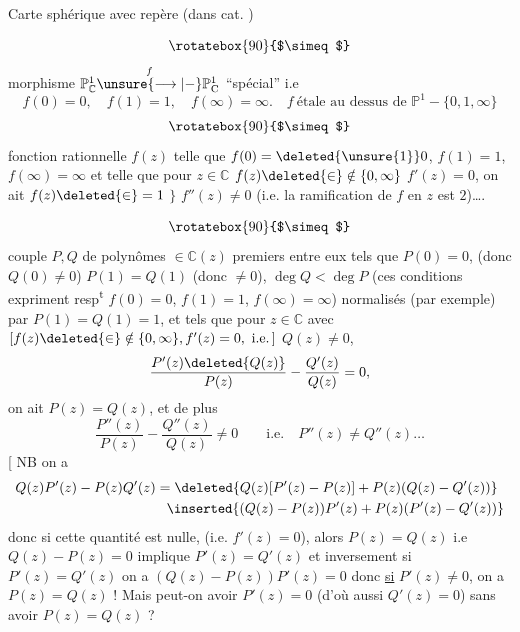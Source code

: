 Carte sphérique  avec repère (dans cat. )

\[
\rotatebox{90}{$\simeq$}
\]
morphisme $\mathbb P^{1}_{\mathbb C}\overset{f}{\unsure{\longrightarrow|-}}\mathbb P^{1}_{\mathrm C}$ ``spécial'' i.e
\[
 f(0)=0,\quad f(1)=1,\quad f(\infty)=\infty.\quad f\ \text{étale au dessus de }\mathbb P^{1}-\{0,1,\infty\}
\]
\[
\rotatebox{90}{$\simeq$}
\]
fonction rationnelle $f(z)$ telle que $f(0)=\deleted{\unsure{1}}0$, $f(1)=1$, $f(\infty)=\infty$ et telle que pour $z\in\mathbb C$  $f(z)\deleted{\in}\notin\{0,\infty\}$ $f'(z)=0$, on ait $f(z)\deleted{\in}=1$ $\}$  $f''(z)\ne0$ (i.e. la ramification de $f$ en $z$ est $2$)\ldots.

\[
\rotatebox{90}{$\simeq$}
\]
couple $P,Q$ \inserted{$[f=P/Q\quad !\,]$} de polynômes $\in\mathbb C(z)$ premiers entre eux  tels que $P(0)=0$, (donc $Q(0)\ne0$) $P(1)=Q(1)$ (donc $\ne0$), $\deg Q<\deg P$ (ces conditions expriment resp\textsuperscript{t} $f(0)=0$, $f(1)=1$, $f(\infty)=\infty$)
normalisés (par exemple) par $P(1)=Q(1)=1$, et tels que pour $z\in\mathbb C$ avec $[f(z)\deleted{\in}\notin\{0,\infty\}, f'(z)=0,\ \mathrm{i.e.}\,]$  $Q(z)\ne0$,
\[
 \frac{P'(z)\deleted{Q(z)}}{P(z)}-\frac{Q'(z)}{Q(z)}=0,
\]
on ait $P(z)=Q(z)$, et de plus
\[
 \frac{P''(z)}{P(z)}-\frac{Q''(z)}{Q(z)}\ne0\qquad\text{i.e.}\quad P''(z)\ne Q''(z)\ldots
\]
[ NB on a
\[
\begin{aligned}
 Q(z)P'(z)-P(z)Q'(z)&=\deleted{Q(z)[P'(z)-P(z)]+P(z)(Q(z)-Q'(z))}\\
 &\phantom{=}\inserted{(Q(z)-P(z))P'(z)+P(z)(P'(z)-Q'(z))}
\end{aligned}
\]
donc si  cette quantité est nulle, (i.e. $f'(z)=0$), alors $P(z)=Q(z)$  i.e $Q(z)-P(z)=0$ implique $P'(z)=Q'(z)$ et inversement si $P'(z)=Q'(z)$ on a $(Q(z)-P(z))P'(z)=0$ donc \uline{si} $P'(z)\ne0$, on a $P(z)=Q(z)$ ! Mais peut-on avoir $P'(z)=0$ (d'où aussi $Q'(z)=0$) \unsure{$\}$|)} sans avoir $P(z)=Q(z)$ ?


